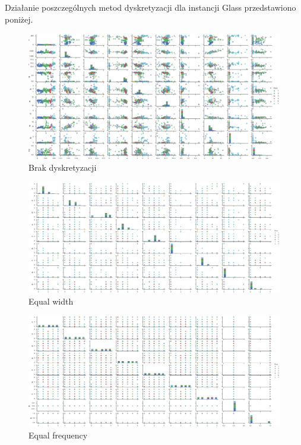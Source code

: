 \documentclass[12pt,a4paper]{article}
\begin{document}
Działanie poszczególnych metod dyskretyzacji dla instancji Glass przedstawiono poniżej.

\begin{figure}[H]
\centering

\includegraphics[width=1\textwidth]{dsGlassCombined.PNG}
\caption{Brak dyskretyzacji}
\end{figure}

\begin{figure}[H]
\centering
\includegraphics[width=1\textwidth]{dsGlassEqWidth.PNG}
\caption{Equal width}
\end{figure}


\begin{figure}[H]
\centering
\includegraphics[width=1\textwidth]{dsGlassEqFreq.png}
\caption{Equal frequency}
\end{figure}
\end{document}
